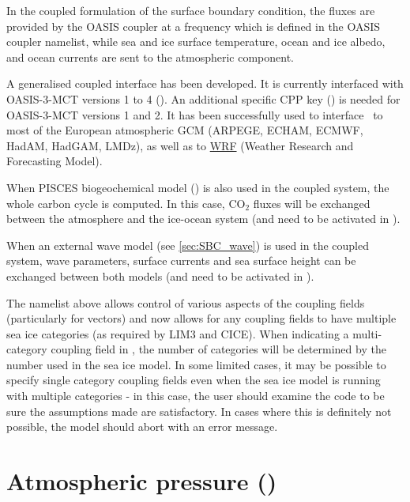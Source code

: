 \documentclass[../main/NEMO_manual]{subfiles}
\begin{document}
In the coupled formulation of the surface boundary condition,
the fluxes are provided by the OASIS coupler at a frequency which is defined in the OASIS coupler namelist,
while sea and ice surface temperature, ocean and ice albedo, and ocean currents are sent to
the atmospheric component.

A generalised coupled interface has been developed.
It is currently interfaced with OASIS-3-MCT versions 1 to 4 ().
An additional specific CPP key () is needed for OASIS-3-MCT versions 1 and 2.
It has been successfully used to interface \NEMO\ to most of the European atmospheric GCM
(ARPEGE, ECHAM, ECMWF, HadAM, HadGAM, LMDz), as well as to \href{http://wrf-model.org/}{WRF}
(Weather Research and Forecasting Model).

When PISCES biogeochemical model () is also used in the coupled system,
the whole carbon cycle is computed.
In this case, CO$_2$ fluxes will be exchanged between the atmosphere and the ice-ocean system
(and need to be activated in  ).


When an external wave model (see \autoref{sec:SBC_wave}) is used in the coupled system, wave parameters, surface currents and sea surface height can be exchanged between both models (and need to be activated in  ).


The namelist above allows control of various aspects of the coupling fields (particularly for vectors) and
now allows for any coupling fields to have multiple sea ice categories (as required by LIM3 and CICE).
When indicating a multi-category coupling field in , the number of categories will be determined by
the number used in the sea ice model.
In some limited cases, it may be possible to specify single category coupling fields even when
the sea ice model is running with multiple categories -
in this case, the user should examine the code to be sure the assumptions made are satisfactory.
In cases where this is definitely not possible, the model should abort with an error message.

\section[Atmospheric pressure (\textit{sbcapr.F90})]{Atmospheric pressure (\protect{})}
\label{sec:SBC_apr}

\begin{listing}
  \caption{}
  \label{lst:namsbc_apr}
\end{listing}
\end{document}
